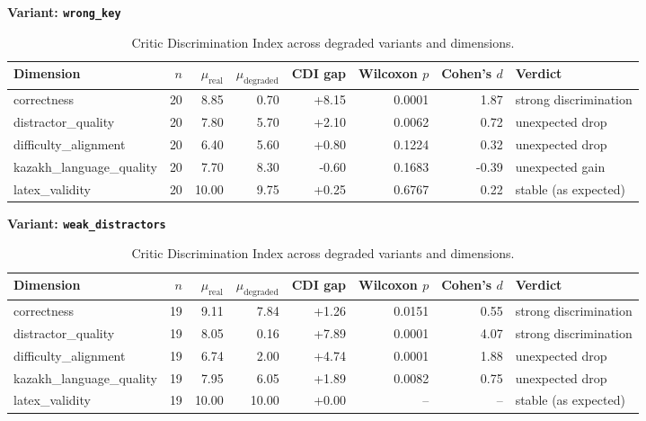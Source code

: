 \begin{table}[t]
\centering
\caption{Critic Discrimination Index across degraded variants and dimensions.}
\label{tab:cdi}
\vspace{0.5em}
\textbf{Variant: \texttt{wrong_key}}\\
\begin{tabular}{lrrrrrrl}
\hline
Dimension & $n$ & $\mu_\text{real}$ & $\mu_\text{degraded}$ & CDI gap & Wilcoxon $p$ & Cohen's $d$ & Verdict \\
\hline
correctness & 20 & 8.85 & 0.70 & +8.15 & 0.0001 & 1.87 & strong discrimination \\
distractor\_quality & 20 & 7.80 & 5.70 & +2.10 & 0.0062 & 0.72 & unexpected drop \\
difficulty\_alignment & 20 & 6.40 & 5.60 & +0.80 & 0.1224 & 0.32 & unexpected drop \\
kazakh\_language\_quality & 20 & 7.70 & 8.30 & -0.60 & 0.1683 & -0.39 & unexpected gain \\
latex\_validity & 20 & 10.00 & 9.75 & +0.25 & 0.6767 & 0.22 & stable (as expected) \\
\hline
\end{tabular}
\vspace{0.5em}
\textbf{Variant: \texttt{weak_distractors}}\\
\begin{tabular}{lrrrrrrl}
\hline
Dimension & $n$ & $\mu_\text{real}$ & $\mu_\text{degraded}$ & CDI gap & Wilcoxon $p$ & Cohen's $d$ & Verdict \\
\hline
correctness & 19 & 9.11 & 7.84 & +1.26 & 0.0151 & 0.55 & strong discrimination \\
distractor\_quality & 19 & 8.05 & 0.16 & +7.89 & 0.0001 & 4.07 & strong discrimination \\
difficulty\_alignment & 19 & 6.74 & 2.00 & +4.74 & 0.0001 & 1.88 & unexpected drop \\
kazakh\_language\_quality & 19 & 7.95 & 6.05 & +1.89 & 0.0082 & 0.75 & unexpected drop \\
latex\_validity & 19 & 10.00 & 10.00 & +0.00 & -- & -- & stable (as expected) \\
\hline
\end{tabular}
\end{table}
